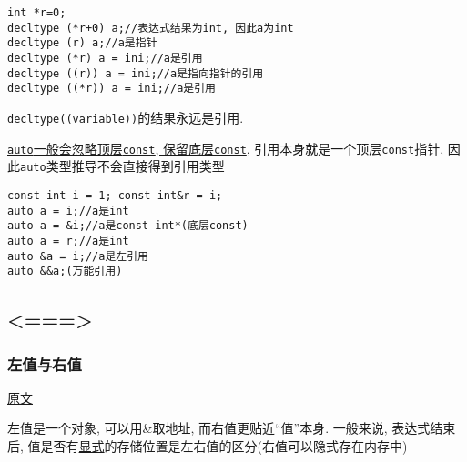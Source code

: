 \begin{paracol}{2}
	\begin{leftcolumn}
		\begin{lstlisting}[title=decltype,basicstyle=\small,columns=flexible,xleftmargin=2em,xrightmargin=2em]
int *r=0;
decltype (*r+0) a;//表达式结果为int, 因此a为int
decltype (r) a;//a是指针
decltype (*r) a = ini;//a是引用
decltype ((r)) a = ini;//a是指向指针的引用
decltype ((*r)) a = ini;//a是引用 
		\end{lstlisting}
		{\tt decltype((variable))}的结果永远是引用.
	\end{leftcolumn}
	\begin{rightcolumn}
		\uline{{\tt auto}一般会忽略顶层{\tt const}, 保留底层{\tt const}}, 引用本身就是一个顶层{\tt const}指针, 因此{\tt auto}类型推导不会直接得到引用类型
		\begin{lstlisting}[basicstyle=\small,columns=flexible,xleftmargin=2em,xrightmargin=2em]
const int i = 1; const int&r = i;
auto a = i;//a是int
auto a = &i;//a是const int*(底层const)
auto a = r;//a是int
auto &a = i;//a是左引用
auto &&a;(万能引用)
		\end{lstlisting}
	\end{rightcolumn}
\end{paracol}
\subsection{<===>\color{purple}{左右值}}
\subsubsection{左值与右值}
 \href{https://zhuanlan.zhihu.com/p/402251966}{原文}

左值是一个对象, 可以用\&取地址, 而右值更贴近“值”本身. 一般来说, 表达式结束后, 
	值是否有\uline{显式}的存储位置是左右值的区分(右值可以隐式存在内存中)


